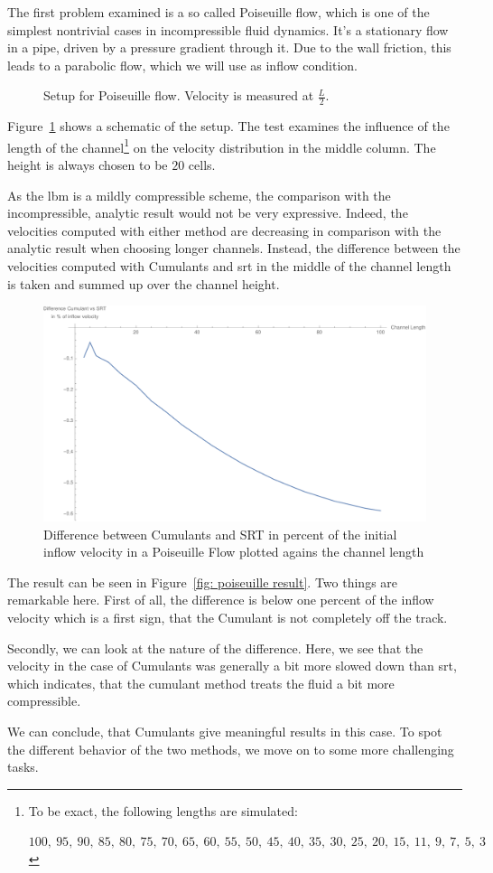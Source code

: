 The first problem examined is a so called Poiseuille flow, which is one of the simplest nontrivial cases in incompressible fluid dynamics.
It's a stationary flow in a pipe, driven by a pressure gradient through it.
Due to the wall friction, this leads to a parabolic flow, which we will use as inflow condition.

\begin{figure}
  \centering
  
  \caption{Setup for Poiseuille flow. Velocity is measured at $\frac{L}{2}$.}
\label{fig: poiseuille}
\end{figure}

Figure~\ref{fig: poiseuille} shows a schematic of the setup.
The test examines the influence of the length of the channel\footnote{To be exact, the following lengths are simulated:\par
 $100,\ 95,\ 90,\ 85,\ 80,\ 75,\ 70,\ 65,\ 60,\ 55,\ 50,\ 45,\ 40,\ 35,\ 30,\ 25,\ 20,\ 15,\ 11,\ 9,\ 7,\ 5,\ 3$
} on the velocity distribution in the middle column.
The height is always chosen to be $20$ cells.

As the \gls{lbm} is a mildly compressible scheme, the comparison with the incompressible, analytic result would not be very expressive.
Indeed, the velocities computed with either method are decreasing in comparison with the analytic result when choosing longer channels.
Instead, the difference between the velocities computed with Cumulants and \gls{srt} in the middle of the channel length is taken and summed up over the channel height.

\begin{figure}
  \centering
  \includegraphics[width=0.8\linewidth]{../figures/poiseuille.pdf} %
  \caption{Difference between Cumulants and SRT in percent of the initial inflow velocity in a Poiseuille Flow plotted agains the channel length}
\label{fig: poiseuille result}
\end{figure}

The result can be seen in Figure~\eqref{fig: poiseuille result}.
Two things are remarkable here.
First of all, the difference is below one percent of the inflow velocity which is a first sign, that the Cumulant is not completely off the track.

Secondly, we can look at the nature of the difference.
Here, we see that the velocity in the case of Cumulants was generally a bit more slowed down than \gls{srt}, which indicates, that the cumulant method treats the fluid a bit more compressible.

We can conclude, that Cumulants give meaningful results in this case.
To spot the different behavior of the two methods, we move on to some more challenging tasks.
